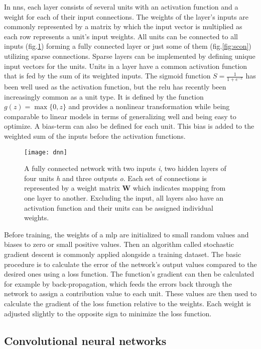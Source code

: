 In \ac{nn}s, each layer consists of several units with an activation function and a
weight for each of their input connections. The weights of the layer's inputs are
commonly represented by a matrix by which the input vector is multiplied as each row
represents a unit's input weights. All units can be connected to all inputs (fig.\ref{fig:fcon})
forming a fully connected layer or just some of them (fig.\ref{fig:scon}) utilizing
sparse connections. Sparse layers can be implemented by defining unique input vectors
for the units. Units in a layer have a common activation function that is fed by the
sum of its weighted inputs. The sigmoid function $S = \frac{1}{1 + e^{-x}}$ has been
well used as the activation function, but the \ac{relu} has recently been increasingly
common as a unit type. It is defined by the function $g(z) = \max\{0,z\}$ and provides a nonlinear transformation
while being comparable to linear models in terms of generalizing well and being easy to
optimize. A bias-term can also be defined for each unit. This bias is added to the
weighted sum of the inputs before the activation functions.

\begin{figure}[H]
\centering
\texttt{[image: dnn]}
\caption{A fully connected network with two inputs \textit{i}, two hidden layers of
         four units \textit{h} and three outputs \textit{o}. Each set of connections
         is represented by a weight matrix \textbf{W} which indicates mapping from one
         layer to another. Excluding the input, all layers also have an activation
         function and their units can be assigned individual weights.}\label{fig:fcon}
\end{figure}

Before training, the weights of a \ac{mlp} are initialized to small random values and
biases to zero or small positive values. Then an algorithm called stochastic gradient
descent is commonly applied alongside a training dataset. The basic procedure is to
calculate the error of the network's output values compared to the desired ones using
a loss function. The function's gradient can then be calculated for example by back-propagation,
which feeds the errors back through the network to assign a contribution value to each unit.
These values are then used to calculate the gradient of the loss function relative to the
weights. Each weight is adjusted slightly to the opposite sign to minimize the loss function.

\subsection{Convolutional neural networks}\label{ssec:dlcnn}

